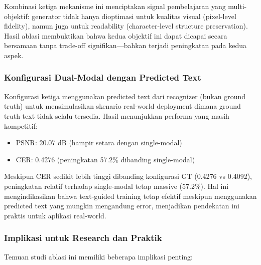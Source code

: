 Kombinasi ketiga mekanisme ini menciptakan signal pembelajaran yang multi-objektif: generator tidak hanya dioptimasi untuk kualitas visual (pixel-level fidelity), namun juga untuk readability (character-level structure preservation). Hasil ablasi membuktikan bahwa kedua objektif ini dapat dicapai secara bersamaan tanpa trade-off signifikan---bahkan terjadi peningkatan pada kedua aspek.

\subsubsection{Konfigurasi Dual-Modal dengan Predicted Text}

Konfigurasi ketiga menggunakan predicted text dari recognizer (bukan ground truth) untuk mensimulasikan skenario real-world deployment dimana ground truth text tidak selalu tersedia. Hasil menunjukkan performa yang masih kompetitif:

\begin{itemize}
    \item PSNR: 20.07 dB (hampir setara dengan single-modal)
    \item CER: 0.4276 (peningkatan 57.2\% dibanding single-modal)
\end{itemize}

Meskipun CER sedikit lebih tinggi dibanding konfigurasi GT (0.4276 vs 0.4092), peningkatan relatif terhadap single-modal tetap massive (57.2\%). Hal ini mengindikasikan bahwa text-guided training tetap efektif meskipun menggunakan predicted text yang mungkin mengandung error, menjadikan pendekatan ini praktis untuk aplikasi real-world.

\subsubsection{Implikasi untuk Research dan Praktik}

Temuan studi ablasi ini memiliki beberapa implikasi penting:

